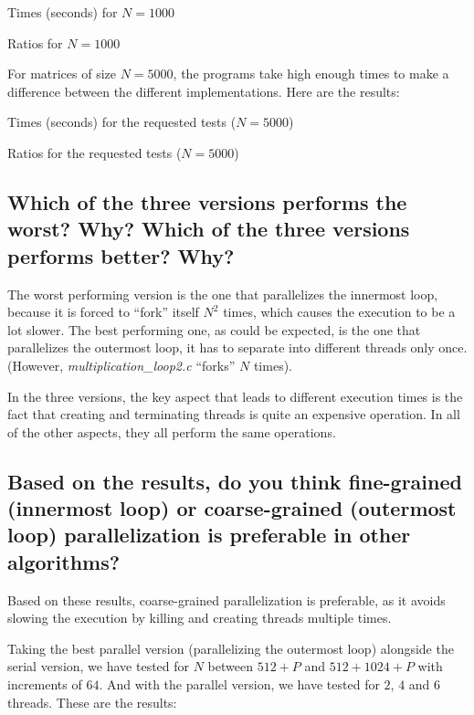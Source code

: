 \documentclass{article}
\newcommand{\question}[1]{\subsection{#1}}
\begin{document}
\begin{table}[h]
    
    \centering
    \caption{Times (seconds) for $N=1000$}
\end{table}

\begin{table}[h]
    
    \centering
    \caption{Ratios for $N=1000$}
\end{table}

For matrices of size $N=5000$, the programs take high enough times to make a difference between the different implementations. Here are the results:

\begin{table}[!h]
    
    \centering
    \caption{Times (seconds) for the requested tests ($N=5000$)}
    \label{5000_times}
\end{table}

\begin{table}[!h]
    
    \centering
    \caption{Ratios for the requested tests ($N=5000$)}
    \label{5000_ratios}
\end{table}

\question{ Which of the three versions performs the worst? Why? Which of the three versions performs better? Why?}

The worst performing version is the one that parallelizes the innermost loop, because it is forced to ``fork'' itself $N^2$ times, which causes the execution to be a lot slower. The best performing one, as could be expected, is the one that parallelizes the outermost loop, it has to separate into different threads only once. (However, \emph{multiplication\_loop2.c} ``forks'' $N$ times).

In the three versions, the key aspect that leads to different execution times is the fact that creating and terminating threads is quite an expensive operation. In all of the other aspects, they all perform the same operations.

\question{Based on the results, do you think fine-grained (innermost loop) or coarse-grained (outermost loop) parallelization is preferable in other algorithms?}

Based on these results, coarse-grained parallelization is preferable, as it avoids slowing the execution by killing and creating threads multiple times. 


Taking the best parallel version (parallelizing the outermost loop) alongside the serial version, we have tested for $N$ between $512+P$ and $512+1024+P$ with increments of $64$. And with the parallel version, we have tested for $2$, $4$ and $6$ threads. These are the results: 
\end{document}
